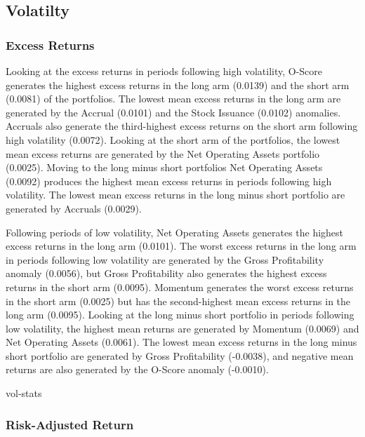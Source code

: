 \documentclass[12pt, a4paper, oneside]{article}
\begin{document}
\subsection{Volatilty}
\subsubsection{Excess Returns}
Looking at the excess returns in periods following high volatility, O-Score generates the highest excess returns in the long arm (0.0139) and the short arm (0.0081) of the portfolios. The lowest mean excess returns in the long arm are generated by the Accrual (0.0101) and the Stock Issuance (0.0102) anomalies. Accruals also generate the third-highest excess returns on the short arm following high volatility (0.0072). Looking at the short arm of the portfolios, the lowest mean excess returns are generated by the Net Operating Assets portfolio (0.0025). Moving to the long minus short portfolios Net Operating Assets (0.0092) produces the highest mean excess returns in periods following high volatility. The lowest mean excess returns in the long minus short portfolio are generated by Accruals (0.0029).

Following periods of low volatility, Net Operating Assets generates the highest excess returns in the long arm (0.0101). The worst excess returns in the long arm in periods following low volatility are generated by the Gross Profitability anomaly (0.0056), but Gross Profitability also generates the highest excess returns in the short arm (0.0095). Momentum generates the worst excess returns in the short arm (0.0025) but has the second-highest mean excess returns in the long arm (0.0095). Looking at the long minus short portfolio in periods following low volatility, the highest mean returns are generated by Momentum (0.0069) and Net Operating Assets (0.0061). The lowest mean excess returns in the long minus short portfolio are generated by Gross Profitability (-0.0038), and negative mean returns are also generated by the O-Score anomaly (-0.0010).

{vol-stats}

\subsubsection{Risk-Adjusted Return}
\end{document}
